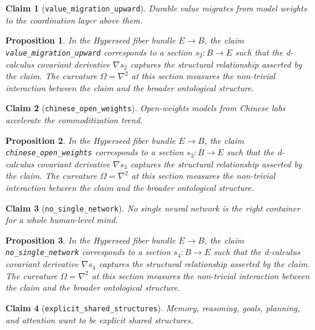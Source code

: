 \documentclass{article}
\newtheorem{claim}{Claim}
\newtheorem{proposition}{Proposition}
\begin{document}
\begin{claim}[\texttt{value_migration_upward}]
Durable value migrates from model weights to the coordination layer above them.
\end{claim}

\begin{proposition}
In the Hyperseed fiber bundle $E \to B$, the claim \texttt{value_migration_upward} corresponds to a section $s_2: B \to E$ such that the d-calculus covariant derivative $\nabla s_2$ captures the structural relationship asserted by the claim. The curvature $\Omega = \nabla^2$ at this section measures the non-trivial interaction between the claim and the broader ontological structure.
\end{proposition}

\begin{claim}[\texttt{chinese_open_weights}]
Open-weights models from Chinese labs accelerate the commoditization trend.
\end{claim}

\begin{proposition}
In the Hyperseed fiber bundle $E \to B$, the claim \texttt{chinese_open_weights} corresponds to a section $s_3: B \to E$ such that the d-calculus covariant derivative $\nabla s_3$ captures the structural relationship asserted by the claim. The curvature $\Omega = \nabla^2$ at this section measures the non-trivial interaction between the claim and the broader ontological structure.
\end{proposition}

\begin{claim}[\texttt{no_single_network}]
No single neural network is the right container for a whole human-level mind.
\end{claim}

\begin{proposition}
In the Hyperseed fiber bundle $E \to B$, the claim \texttt{no_single_network} corresponds to a section $s_4: B \to E$ such that the d-calculus covariant derivative $\nabla s_4$ captures the structural relationship asserted by the claim. The curvature $\Omega = \nabla^2$ at this section measures the non-trivial interaction between the claim and the broader ontological structure.
\end{proposition}

\begin{claim}[\texttt{explicit_shared_structures}]
Memory, reasoning, goals, planning, and attention want to be explicit shared structures.
\end{claim}
\end{document}
